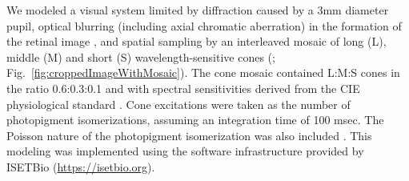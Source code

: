 \documentclass{jov}
\begin{document}
We modeled a visual system limited by diffraction caused by a 3mm diameter pupil, optical blurring (including axial chromatic aberration) in the formation of the retinal image \cite{marimont1994matching}, and spatial sampling by an interleaved mosaic of long (L), middle (M)  and short (S) wavelength-sensitive cones (; Fig.~\ref{fig:croppedImageWithMosaic}). 
The cone mosaic contained L:M:S cones in the ratio 0.6:0.3:0.1 and with spectral sensitivities derived from the CIE physiological standard \cite{CIE86}.
Cone excitations were taken as the number of photopigment isomerizations, assuming an integration time of 100 msec. The Poisson nature of the photopigment isomerization was also included \cite{hecht1942energy}. 
This modeling was implemented using the software infrastructure provided by ISETBio (\href{https://isetbio.org}{https://isetbio.org}).
\end{document}
